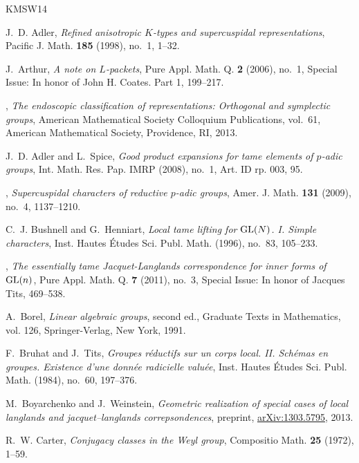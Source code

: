 \documentclass{amsart}
\theoremstyle{plain}
\theoremstyle{definition}
\theoremstyle{remark}
\theoremstyle{theorem}
\begin{document}
\begin{thebibliography}{KMSW14}

J.~D. Adler, \emph{Refined anisotropic {$K$}-types and supercuspidal
  representations}, Pacific J. Math. \textbf{185} (1998), no.~1, 1--32.

J.~Arthur, \emph{A note on {$L$}-packets}, Pure Appl. Math. Q. \textbf{2}
  (2006), no.~1, Special Issue: In honor of John H. Coates. Part 1, 199--217.

\bysame, \emph{The endoscopic classification of representations: Orthogonal and
  symplectic groups}, American Mathematical Society Colloquium Publications,
  vol.~61, American Mathematical Society, Providence, RI, 2013.

J.~D. Adler and L.~Spice, \emph{Good product expansions for tame elements of
  {$p$}-adic groups}, Int. Math. Res. Pap. IMRP (2008), no.~1, Art. ID rp. 003,
  95.

\bysame, \emph{Supercuspidal characters of reductive {$p$}-adic groups}, Amer.
  J. Math. \textbf{131} (2009), no.~4, 1137--1210.

C.~J. Bushnell and G.~Henniart, \emph{Local tame lifting for {${\rm GL}(N)$}.
  {I}. {S}imple characters}, Inst. Hautes {\'E}tudes Sci. Publ. Math. (1996),
  no.~83, 105--233.

\bysame, \emph{The essentially tame {J}acquet-{L}anglands correspondence for
  inner forms of {${\rm GL}(n)$}}, Pure Appl. Math. Q. \textbf{7} (2011),
  no.~3, Special Issue: In honor of Jacques Tits, 469--538.

A.~Borel, \emph{Linear algebraic groups}, second ed., Graduate Texts in
  Mathematics, vol. 126, Springer-Verlag, New York, 1991.

F.~Bruhat and J.~Tits, \emph{Groupes r\'eductifs sur un corps local. {II}.
  {S}ch\'emas en groupes. {E}xistence d'une donn\'ee radicielle valu\'ee},
  Inst. Hautes \'Etudes Sci. Publ. Math. (1984), no.~60, 197--376.

M.~Boyarchenko and J.~Weinstein, \emph{Geometric realization of special cases
  of local langlands and jacquet--langlands correpsondences}, preprint,
  \url{arXiv:1303.5795}, 2013.

R.~W. Carter, \emph{Conjugacy classes in the {W}eyl group}, Compositio Math.
  \textbf{25} (1972), 1--59.


\end{thebibliography}
\end{document}
